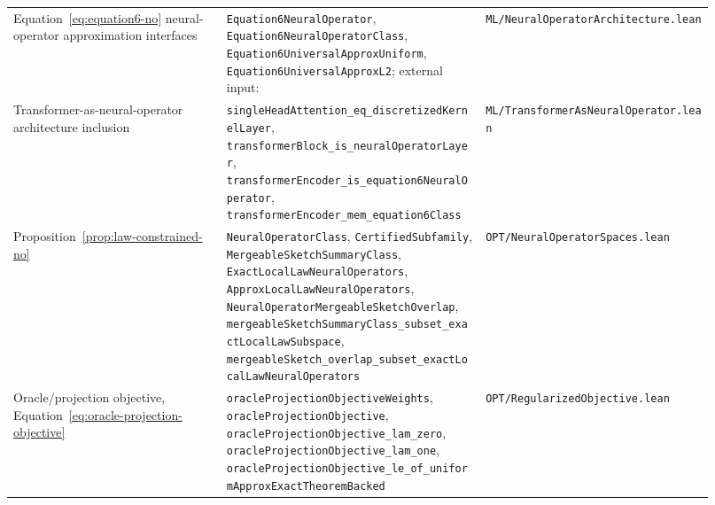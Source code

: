 {\begin{longtable}{p{0.28\linewidth}p{0.34\linewidth}p{0.30\linewidth}}
Equation~\eqref{eq:equation6-no} neural-operator approximation interfaces &
\texttt{Equation6NeuralOperator}, \texttt{Equation6NeuralOperatorClass}, \texttt{Equation6UniversalApproxUniform}, \texttt{Equation6UniversalApproxL2}; external input: \citet[Theorems~11,13]{Kovachki23NeuralOperator} &
\texttt{ML/NeuralOperatorArchitecture.lean} \\

Transformer-as-neural-operator architecture inclusion &
\texttt{singleHeadAttention\_eq\_discretizedKernelLayer}, \texttt{transformerBlock\_is\_neuralOperatorLayer}, \texttt{transformerEncoder\_is\_equation6NeuralOperator}, \texttt{transformerEncoder\_mem\_equation6Class} &
\texttt{ML/TransformerAsNeuralOperator.lean} \\

Proposition~\ref{prop:law-constrained-no} &
\texttt{NeuralOperatorClass}, \texttt{CertifiedSubfamily}, \texttt{MergeableSketchSummaryClass}, \texttt{ExactLocalLawNeuralOperators}, \texttt{ApproxLocalLawNeuralOperators}, \texttt{NeuralOperatorMergeableSketchOverlap}, \texttt{mergeableSketchSummaryClass\_subset\_exactLocalLawSubspace}, \texttt{mergeableSketch\_overlap\_subset\_exactLocalLawNeuralOperators} &
\texttt{OPT/NeuralOperatorSpaces.lean} \\

Oracle/projection objective, Equation~\eqref{eq:oracle-projection-objective} &
\texttt{oracleProjectionObjectiveWeights}, \texttt{oracleProjectionObjective}, \texttt{oracleProjectionObjective\_lam\_zero}, \texttt{oracleProjectionObjective\_lam\_one}, \texttt{oracleProjectionObjective\_le\_of\_uniformApproxExactTheoremBacked} &
\texttt{OPT/RegularizedObjective.lean} \\


\end{longtable}}
